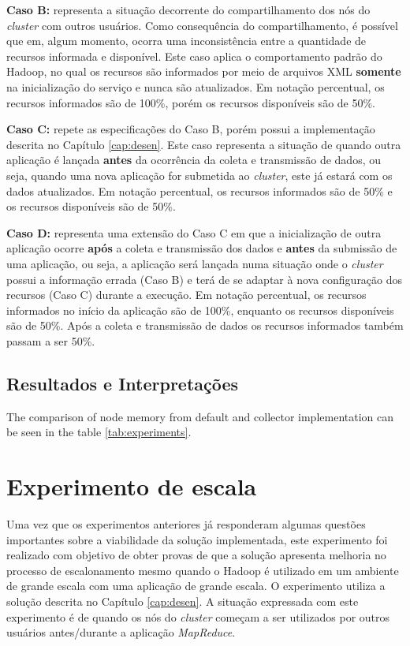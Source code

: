 \textbf{Caso B:} representa a situação decorrente do compartilhamento dos nós do \textit{cluster} com outros usuários. Como consequência do compartilhamento, é possível que em, algum momento, ocorra uma inconsistência entre a quantidade de recursos informada e disponível. Este caso aplica o comportamento padrão do Hadoop, no qual os recursos são informados por meio de arquivos XML \textbf{somente} na inicialização do serviço e nunca são atualizados. Em notação percentual, os recursos informados são de 100\%, porém os recursos disponíveis são de 50\%.

\textbf{Caso C:} repete as especificações do Caso B, porém possui a implementação descrita no Capítulo \ref{cap:desen}. Este caso representa a situação de quando outra aplicação é lançada \textbf{antes} da ocorrência da coleta e transmissão de dados, ou seja, quando uma nova aplicação for submetida ao \textit{cluster}, este já estará com os dados atualizados. Em notação percentual, os recursos informados são de 50\% e os recursos disponíveis são de 50\%.

\textbf{Caso D:} representa uma extensão do Caso C em que a inicialização de outra aplicação ocorre \textbf{após} a coleta e transmissão dos dados e \textbf{antes} da submissão de uma aplicação, ou seja, a aplicação será lançada numa situação onde o \textit{cluster} possui a informação errada (Caso B) e terá de se adaptar à nova configuração dos recursos (Caso C) durante a execução. Em notação percentual, os recursos informados no início da aplicação são de 100\%, enquanto os recursos disponíveis são de 50\%. Após a coleta e transmissão de dados os recursos informados também passam a ser 50\%.

\subsection{Resultados e Interpretações}
The comparison of node memory from default and collector implementation can be seen in the table \ref{tab:experiments}.

\section{Experimento de escala}
Uma vez que os experimentos anteriores já responderam algumas questões importantes sobre a viabilidade da solução implementada, este experimento foi realizado com objetivo de obter provas de que a solução apresenta melhoria no processo de escalonamento mesmo quando o Hadoop é utilizado em um ambiente de grande escala com uma aplicação de grande escala. O experimento utiliza a solução descrita no Capítulo \ref{cap:desen}. A situação expressada com este experimento é de quando os nós do \textit{cluster} começam a ser utilizados por outros usuários antes/durante a aplicação \textit{MapReduce}.

